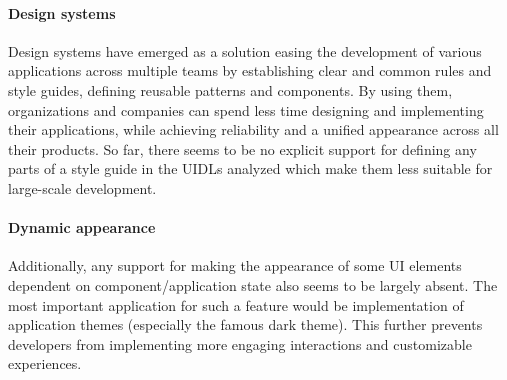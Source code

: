 \paragraph{Design systems}
Design systems have emerged as a solution easing the development of various applications across multiple teams by establishing clear and common rules and style guides, defining reusable patterns and components.
By using them, organizations and companies can spend less time designing and implementing their applications, while achieving reliability and a unified appearance across all their products.
So far, there seems to be no explicit support for defining any parts of a style guide in the UIDLs analyzed which make them less suitable for large-scale development.

\paragraph{Dynamic appearance}
Additionally, any support for making the appearance of some UI elements dependent on component/application state also seems to be largely absent.
The most important application for such a feature would be implementation of application themes (especially the famous dark theme).
This further prevents developers from implementing more engaging interactions and customizable experiences.
